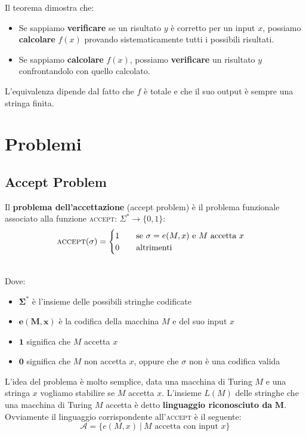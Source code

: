 \noindent Il teorema dimostra che:
\begin{itemize}
    \item Se sappiamo \textbf{verificare} se un risultato
    $y$ è corretto per un input $x$, possiamo
    \textbf{calcolare} $f(x)$ provando sistematicamente
    tutti i possibili risultati.

    \item Se sappiamo \textbf{calcolare} $f(x)$,
    possiamo \textbf{verificare} un risultato $y$
    confrontandolo con quello calcolato.
\end{itemize}
L'equivalenza dipende dal fatto che $f$ è totale e che il suo output è sempre una stringa finita.


\newpage

\section{Problemi}
\subsection{Accept Problem}
\colorbox{SALZO}{\parbox{\dimexpr\linewidth-2\fboxsep}{\begin{definition}
   Il \textbf{problema dell'accettazione} (accept problem) è il problema funzionale associato alla funzione \textsc{accept}: $\Sigma^* \to \{ 0,1 \}$:
   \[  \textsc{accept}(\sigma) = \begin{cases}
    1 \qquad \text{se } \sigma = e(M,x) \text{ e } M \text{ accetta } x \\
    0 \qquad \text{altrimenti}
   \end{cases}  \]
\end{definition}}}\smallskip\\
Dove:
\begin{itemize}
    \item $\bm{\Sigma^*}$ è l'insieme delle possibili stringhe codificate
    \item $\bm{e(M,x)}$ è la codifica della macchina $M$ e del suo input $x$
    \item $\bm{1}$ significa che $M$ accetta $x$ 
    \item $\bm{0}$ significa che $M$ non accetta $x$, oppure che $\sigma$ non è una codifica valida
\end{itemize}
L'idea del problema è molto semplice, data una macchina di Turing $M$ e una stringa $x$ vogliamo stabilire se $M$ accetta $x$. L'insieme $L(M)$ delle stringhe che una macchina di Turing $M$ accetta è detto \textbf{linguaggio riconosciuto da }$\bm{M}$. 
Ovviamente il linguaggio corrispondente all'\textsc{accept} è il seguente:
\[ \mathcal{A} = \{ e(M,x) \ | \ M \text{ accetta con input } x   \} \]


